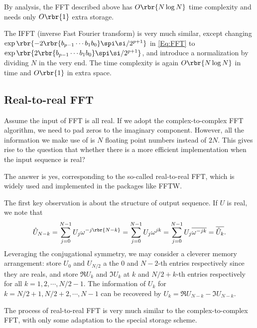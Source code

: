 \documentclass[english, nochinese]{pnote}
\begin{document}
By analysis, the FFT described above has $ O \rbr{ N \log N }$ time complexity and needs only $ O \rbr{1} $ extra storage.

The IFFT (inverse Fast Fourier transform) is very much similar, except changing $ \exp \rbr{ -2 \rbr{ b_{ p - 1 } \cdots b_1 b_0 } \spi \si / 2^{ p + 1 } } $ in \eqref{Eq:FFT} to $ \exp \rbr{ 2 \rbr{ b_{ p - 1 } \cdots b_1 b_0 } \spi \si / 2^{ p + 1 } } $, and introduce a normalization by dividing $N$ in the very end. The time complexity is again $ O \rbr{ N \log N } $ in time and $ O \rbr{1} $ in extra space.

\subsection{Real-to-real FFT}

Assume the input of FFT is all real. If we adopt the complex-to-complex FFT algorithm, we need to pad zeros to the imaginary component. However, all the information we make use of is $N$ floating point numbers instead of $ 2 N $. This gives rise to the question that whether there is a more efficient implementation when the input sequence is real?

The answer is yes, corresponding to the so-called real-to-real FFT, which is widely used and implemented in the packages like FFTW.

The first key observation is about the structure of output sequence. If $U$ is real, we note that
\begin{equation}
\hat{U}_{ N - k } = \sum_{ j = 0 }^{ N - 1 } U_j \omega^{ -j \rbr{ N - k } } = \sum_{ j = 0 }^{ N - 1 } U_j \omega^{ j k } = \sum_{ j = 0 }^{ N - 1 } U_j \overline{\omega^{ -j k }} = \overline{\hat{U}_k}.
\end{equation}
Leveraging the conjugational symmetry, we may consider a cleverer memory arrangement: store $U_0$ and $ U_{ N / 2 } $ a the $0$ and $ N - 2 $-th entries respectively since they are reals, and store $ \Re U_k $ and $ \Im U_k $ at $k$ and $ N / 2 + k $-th entries respectively for all $ k = 1, 2, \cdots, N / 2 - 1 $. The information of $U_k$ for $ k = N / 2 + 1, N / 2 + 2, \cdots, N - 1 $ can be recovered by $ U_k = \Re U_{ N - k } - \Im U_{ N - k } $.

The process of real-to-real FFT is very much similar to the complex-to-complex FFT, with only some adaptation to the special storage scheme.
\end{document}
